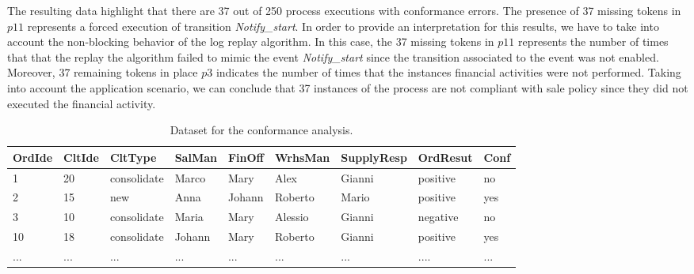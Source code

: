 \documentclass{llncs}
\begin{document}
The resulting data highlight  that there are 37 out of 250 process
executions with conformance errors.
The presence of 37 missing tokens in $p11$ represents a forced
execution of  transition \emph{Notify\_start}.
In order to provide an interpretation for this results, we have to
take into account the non-blocking behavior of the log replay
algorithm. In this case, the 37 missing tokens in $p11$ represents the
number of times that that the replay the algorithm failed to mimic the
event \emph{Notify\_start} since the transition associated to the
event was not enabled. 
Moreover, 37 remaining tokens in place $p3$ indicates the number of
times that the instances financial activities were not performed.
Taking into account the application scenario, we can conclude that 
37 instances of the process are not compliant with sale policy since
they did not executed the financial activity.




\begin{table}[!h]
\scriptsize{
\centering
\begin{tabular}{|p{1cm}|p{1cm}|p{}|p{}|p{}|p{}|p{}|p{}|p{}|}
\hline OrdIde & CltIde & CltType & SalMan & FinOff & WrhsMan & SupplyResp & OrdResut & Conf\\
\hline
1 & 20 & consolidate & Marco & Mary & Alex & Gianni & positive & no\\
\hline
2 & 15 & new & Anna & Johann & Roberto & Mario & positive & yes\\
\hline
3 & 10 &consolidate & Maria & Mary & Alessio & Gianni & negative & no\\
\hline
10 & 18 & consolidate & Johann & Mary & Roberto & Gianni & positive & yes \\
\hline
... & ... & ... & ... & ... & ... & ... & .... & ...  \\
\hline
\end{tabular}
}
\caption{Dataset for the conformance analysis.}
\label{tab:SaleData}
\end{table}
\normalsize
\end{document}
